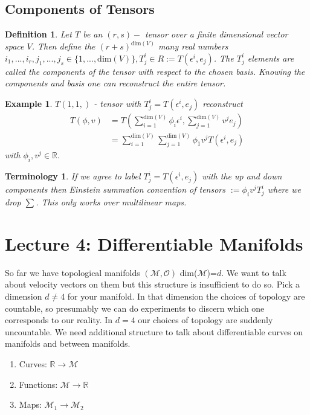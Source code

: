 \documentclass[10pt, oneside]{article}
\newcommand{\R}{\mathbb{R}}
\newcommand{\M}{\mathcal{M}}
\newtheorem{defn}{Definition}
\newtheorem{example}{Example}
\newtheorem{Terminology}{Terminology}
\begin{document}
     \subsection{Components of Tensors}
        \begin{defn}
           Let $T$ be an $(r,s) - $ tensor over a finite dimensional vector space $V$. Then define the $(r+s)^{\text{dim}(V)}$ many real numbers $i_1,...,i_r, j_1,...,j_s \in \{1,...,\text{dim}(V)\}, T^i_j \in R := T(\epsilon^i,e_j)$. The $T^i_j$ elements are called the components of the tensor with respect to the chosen basis.
           Knowing the components and basis one can reconstruct the entire tensor.
        \end{defn}
        \begin{example}
           $T (1,1,)$ - tensor with $T^i_j = T(\epsilon^i,e_j)$ reconstruct
           \begin{align*}
              T(\phi,v) &= T(\sum_{i=1}^{\text{dim}(V)}\phi_i \epsilon^i, \sum_{j=1}^{\text{dim}(V)}v^j e_j) \\
              &=\sum_{i=1}^{\text{dim}(V)}\sum_{j=1}^{\text{dim}(V)} \phi_1 v^j T(\epsilon^i,e_j)
           \end{align*}
           with $\phi_i, v^j \in \R$.
        \end{example}
        \begin{Terminology}
           If we agree to label $T^i_j = T(\epsilon^i,e_j)$ with the up and down components then Einstein summation convention of tensors $:= \phi_i v^j T^i_j$ where we drop $\sum$. This only works over multilinear maps.
        \end{Terminology}
\section{Lecture 4: Differentiable Manifolds}
  So far we have topological manifolds $(\M,\mathcal{O})$ dim($\M$)=$d$. We want to talk about velocity vectors on them but this structure is insufficient to do so.
  Pick a dimension $d \neq 4$ for your manifold. In that dimension the choices of topology are countable, so presumably we can do experiments to discern which one corresponds to our reality.
  In $d=4$ our choices of topology are suddenly uncountable. We need additional structure to talk about differentiable curves on manifolds and between manifolds.
  \begin{enumerate}
     \item Curves: $\R \to \M$
     \item Functions: $\M \to \R$
     \item Maps: $\M_1 \to \M_2$
  \end{enumerate}
\end{document}
